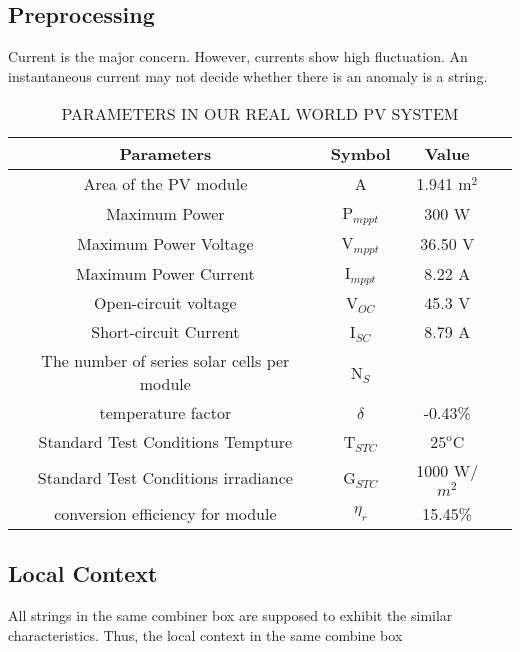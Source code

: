 \documentclass[journal]{IEEEtran}
\begin{document}
\subsection{Preprocessing}
Current is the major concern. However, currents show high fluctuation. An instantaneous current may not decide whether there is an anomaly is a string.
\begin{table}[!h]
\scriptsize
\caption{PARAMETERS IN OUR REAL WORLD PV SYSTEM}
 \label{sctn:model}
\centering
\begin{tabular}{| c | c | c  | c |}
\hline
  Parameters              & Symbol  & Value     \\
\hline
Area of the PV module         & A  & 1.941 m$^2$        \\
\hline
Maximum Power       & P$_{mppt}$  & 300 W    \\
\hline
Maximum Power Voltage       & V$_{mppt}$  &  36.50 V  \\
\hline
Maximum Power Current       & I$_{mppt}$  &  8.22 A \\
\hline
Open-circuit voltage        & V$_{OC}$  &  45.3 V  \\
\hline
Short-circuit Current        & I$_{SC}$  &  8.79 A \\
\hline
The number of series solar cells per module        & N$_{S}$  &    \\
\hline
temperature factor        & $\delta$  & -0.43\%   \\
\hline
Standard Test Conditions Tempture        & T$_{STC}$  & $25^\text{o}$C   \\
\hline
Standard Test Conditions irradiance        & G$_{STC}$  & 1000  W/$m^2$   \\
\hline
conversion efficiency for module        & $\eta_r$  & 15.45\%   \\
\hline
\end{tabular}
\label{tb:RE_Uniform}
\end{table}

\subsection{Local Context}
All strings in the same combiner box are supposed to exhibit the similar characteristics. Thus, the local context in the same combine box 
\end{document}
